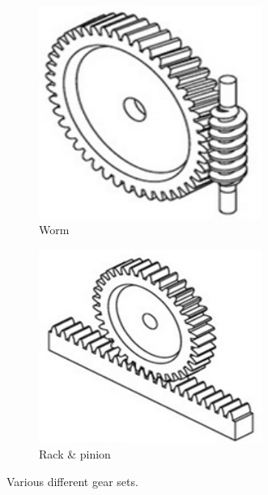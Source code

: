\begin{figure}[H]
	\begin{subfigure}[b]{.32\linewidth}
		\includegraphics[width=0.8\textwidth]{imgs/gear_worm.png}
		\caption{Worm}
	\end{subfigure}\begin{subfigure}[b]{.32\linewidth}
		\includegraphics[width=0.8\textwidth]{imgs/gear_rack_pinion.png}
		\caption{Rack \& pinion}
	\end{subfigure}
	\caption{Various different gear sets.}
\end{figure}

